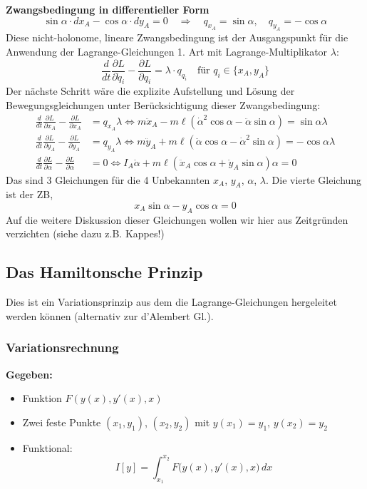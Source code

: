 \documentclass[10pt, letterpaper]{article}
\begin{document}
\textbf{Zwangsbedingung in differentieller Form}
\[
\sin\alpha \cdot dx_A - \cos\alpha \cdot dy_A = 0
\quad \Rightarrow \quad
q_{x_A} = \sin\alpha, \quad q_{y_A} = -\cos\alpha
\]
Diese nicht-holonome, lineare Zwangsbedingung ist der Ausgangspunkt für die Anwendung der Lagrange-Gleichungen 1. Art mit Lagrange-Multiplikator \( \lambda \):
\[
\frac{d}{dt} \frac{\partial L}{\partial \dot{q}_i} - \frac{\partial L}{\partial q_i} = \lambda \cdot q_{q_i}
\quad \text{für } q_i \in \{x_A, y_A\}
\]
Der nächste Schritt wäre die explizite Aufstellung und Lösung der Bewegungsgleichungen unter Berücksichtigung dieser Zwangsbedingung:
\begin{align*}
\frac{d}{dt}\frac{\partial L}{\partial x_A} - \frac{\partial L}{\partial x_A} &= q_{x_A}\lambda \Leftrightarrow m\ddot{x}_A - m\ell(\dot{\alpha}^2\cos\alpha - \ddot{\alpha}\sin\alpha) = \sin\alpha\lambda \\
\frac{d}{dt}\frac{\partial L}{\partial y_A} - \frac{\partial L}{\partial y_A} &= q_{y_A}\lambda \Leftrightarrow m\ddot{y}_A + m\ell(\ddot{\alpha}\cos\alpha - \dot{\alpha}^2\sin\alpha) = -\cos\alpha\lambda \\
\frac{d}{dt}\frac{\partial L}{\partial \alpha} - \frac{\partial L}{\partial \alpha} &= 0 \Leftrightarrow I_A\ddot{\alpha} + m\ell(\ddot{x}_A\cos\alpha + \ddot{y}_A\sin\alpha)\alpha = 0
\end{align*}
Das sind 3 Gleichungen für die 4 Unbekannten $x_A$, $y_A$, $\alpha$, $\lambda$. Die vierte Gleichung ist der ZB, 
$$x_A \sin\alpha - y_A \cos\alpha = 0$$
Auf die weitere Diskussion dieser Gleichungen wollen wir hier aus Zeitgründen verzichten (siehe dazu z.B. Kappes!)




\pagebreak


\subsection{Das Hamiltonsche Prinzip}

Dies ist ein Variationsprinzip aus dem die Lagrange-Gleichungen hergeleitet werden können (alternativ zur d'Alembert Gl.).



\subsubsection{Variationsrechnung}

\textbf{Gegeben:}
\begin{itemize}
  \item Funktion \( F(y(x), y'(x), x) \)
  \item Zwei feste Punkte \( (x_1, y_1) \), \( (x_2, y_2) \) mit \( y(x_1) = y_1, \, y(x_2) = y_2 \)
  \item Funktional:
  \[
  I[y] = \int_{x_1}^{x_2} F\big(y(x), y'(x), x\big)\, dx
  \]
\end{itemize}
\end{document}

